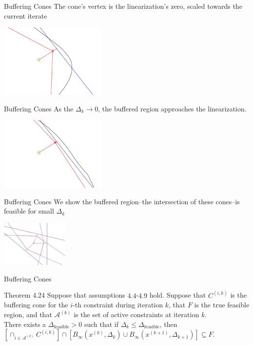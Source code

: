 \documentclass{beamer}
\newcommand{\xk}{{{x}^{(k)}}}
\newcommand{\dk}{{\Delta_k}}
\begin{document}
\begin{frame}{Buffering Cones}
	The cone's vertex is the linearization's zero, scaled towards the current iterate
	\begin{center}
		\includegraphics[width=200px]{images/explanation_2.png}
	\end{center}
\end{frame}


\begin{frame}{Buffering Cones}
	As the $\dk \to 0$, the buffered region approaches the linearization.
	\begin{center}
		\includegraphics[width=200px]{images/explanation_3.png}
	\end{center}
\end{frame}


\begin{frame}{Buffering Cones}
	We show the buffered region--the intersection of these cones--is feasible for small $\Delta_k$
 	\begin{center}
 		\includegraphics[width=125px]{images/completed_1.png}
 	\end{center}
\end{frame}

\begin{frame}{Buffering Cones}
	\begin{block}{Theorem 4.24}
		Suppose that assumptions $4.4$-$4.9$ hold.
		Suppose that $C^{(i, k)}$ is the buffering cone for the $i$-th constraint during iteration $k$,
		that $F$ is the true feasible region,
		and that $\mathcal A^{(k)}$ is the set of active constraints at iteration $k$. \\
		There exists a $\Delta_{\textrm{feasible}} > 0$ such that
		if $\Delta_k \le \Delta_{\textrm{feasible}}$, then 
		$\left[\cap_{i \in \mathcal A^{(k)}} C^{(i, k)} \right] \cap \left[B_{\infty}\left(\xk, \Delta_{k}\right) \cup B_{\infty}\left(x^{(k+1)}, \Delta_{k+1}\right)\right] \subseteq F$.
	\end{block}
\end{frame}
\end{document}
